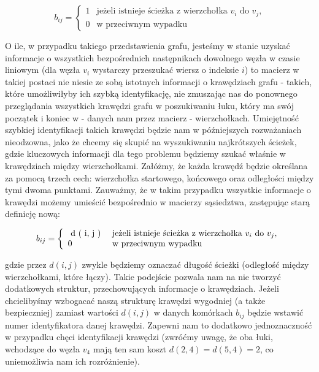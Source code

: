 \begin{equation}
	b_{ij}= \left\{ 
	\begin{array}{ll}
	1 & \textrm{jeżeli istnieje ścieżka z wierzchołka $v_{i}$ do $v_{j}$,}\\
	0 & \textrm{w przeciwnym wypadku}
	\end{array} \right.
\end{equation}


O ile, w przypadku takiego przedstawienia grafu, jesteśmy w stanie uzyskać informacje o wszystkich bezpośrednich następnikach dowolnego węzła w czasie liniowym (dla węzła $v_{i}$ wystarczy przeszukać wiersz o indeksie $i$) to macierz w takiej postaci nie niesie ze sobą istotnych informacji o krawędziach grafu - takich, które umożliwiłyby ich szybką identyfikację, nie zmuszając nas do ponownego przeglądania wszystkich krawędzi grafu w poszukiwaniu łuku, który ma swój początek i koniec w - danych nam przez macierz - wierzchołkach. Umiejętność szybkiej identyfikacji takich krawędzi będzie nam w późniejszych rozważaniach nieodzowna, jako że chcemy się skupić na wyszukiwaniu najkrótszych ścieżek, gdzie kluczowych informacji dla tego problemu będziemy szukać właśnie w krawędziach między wierzchołkami. Załóżmy, że każda krawędź będzie określana za pomocą trzech cech: wierzchołka startowego, końcowego oraz odległości między tymi dwoma punktami. Zauważmy, że w takim przypadku wszystkie informacje o krawędzi możemy umieścić bezpośrednio w macierzy sąsiedztwa, zastępując starą definicję nową: 

\begin{equation}
	b_{ij}= \left\{ 
	\begin{array}{ll}
	$ d ( i, j ) $ & \textrm{jeżeli istnieje ścieżka z wierzchołka $v_{i}$ do $v_{j}$,}\\
	0 & \textrm{w przeciwnym wypadku}
	\end{array} \right.
\end{equation}

gdzie przez $ d \left( i,j \right) $ zwykle będziemy oznaczać długość ścieżki (odległość między wierzchołkami, które łączy). Takie podejście pozwala nam na nie tworzyć dodatkowych struktur, przechowujących informacje o krawędziach. Jeżeli chcielibyśmy wzbogacać naszą strukturę krawędzi wygodniej (a także bezpieczniej) zamiast wartości $d \left( i,j \right)$ w danych komórkach $b_{ij}$ będzie wstawić numer identyfikatora danej krawędzi. Zapewni nam to dodatkowo jednoznaczność w przypadku chęci identyfikacji krawędzi (zwróćmy uwagę, że oba łuki, wchodzące do węzła $v_{4}$ mają ten sam koszt $ d \left( 2, 4 \right) = d \left( 5, 4 \right) = 2$, co uniemożliwia nam ich rozróżnienie).

